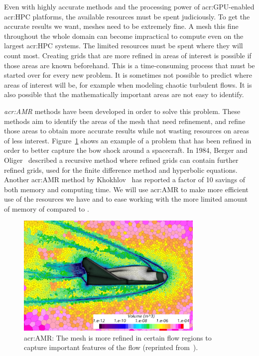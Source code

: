 Even with highly accurate methods and the processing power of \acrshort{acr:GPU}-enabled
\acrshort{acr:HPC} platforms, the available resources must be spent judiciously. To get the accurate
results we want, meshes need to be extremely fine. A mesh this fine throughout the whole domain can
become impractical to compute even on the largest \acrshort{acr:HPC} systems. The limited resources
must be spent where they will count most. Creating grids that are more refined in areas of interest
is possible if those areas are known beforehand. This is a time-consuming process that must be
started over for every new problem. It is sometimes not possible to predict where areas of interest
will be, for example when modeling chaotic turbulent flows. It is also possible that the
mathematically important areas are not easy to identify. 

\textit{\Acrfull{acr:AMR}} methods have been developed in order to solve this problem. These methods
aim to identify the areas of the mesh that need refinement, and refine those areas to obtain more
accurate results while not wasting resources on areas of less interest. Figure~\ref{fig:intro_amr}
shows an example of a problem that has been refined in order to better capture the bow shock around
a spacecraft. In 1984, Berger and Oliger~\cite{Berger1984} described a recursive method where
refined grids can contain further refined grids, used for the finite difference method and
hyperbolic equations. Another \acrshort{acr:AMR} method by Khokhlov~\cite{Khokhlov1998} has reported
a factor of 10 savings of both memory and computing time. We will use \acrlong{acr:AMR} to make more
efficient use of the resources we have and to ease working with the more limited amount of memory of
 compared to .

\begin{figure}[H]
	\centering
	\includegraphics[width=0.8\textwidth]{Chapter_introduction/media/adaptive_mesh_refinement}
	\caption{\Acrlong{acr:AMR}: The mesh is more refined in certain flow regions to capture important features of the flow (reprinted from~\cite{Siemens2020}).}\label{fig:intro_amr}
\end{figure}

